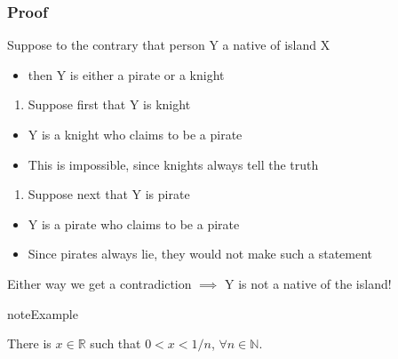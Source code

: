 \documentclass[letterpaper,10pt,english]{jupyterBook}
\begin{document}
\subsubsection*{Proof}

\sphinxAtStartPar
Suppose to the contrary that person Y  a native of island X
\begin{itemize}
\item {} 
\sphinxAtStartPar
then Y is either a pirate or a knight

\end{itemize}
\begin{enumerate}
%
\item {} 
\sphinxAtStartPar
Suppose first that Y is knight

\end{enumerate}
\begin{itemize}
\item {} 
\sphinxAtStartPar
Y is a knight who claims to be a pirate

\item {} 
\sphinxAtStartPar
This is impossible, since knights always tell the truth

\end{itemize}
\begin{enumerate}
%
\setcounter{enumi}{1}
\item {} 
\sphinxAtStartPar
Suppose next that Y is pirate

\end{enumerate}
\begin{itemize}
\item {} 
\sphinxAtStartPar
Y is a pirate who claims to be a pirate

\item {} 
\sphinxAtStartPar
Since pirates always lie, they would not make such a statement

\end{itemize}

\sphinxAtStartPar
Either way we get a contradiction \(\implies\) Y is not a native of the island!

\begin{sphinxadmonition}{note}{Example}

\sphinxAtStartPar
There is  \(x \in \mathbb{R}\) such that \(0 < x < 1/n\), \(\forall n \in \mathbb{N}\).
\end{sphinxadmonition}
\end{document}
